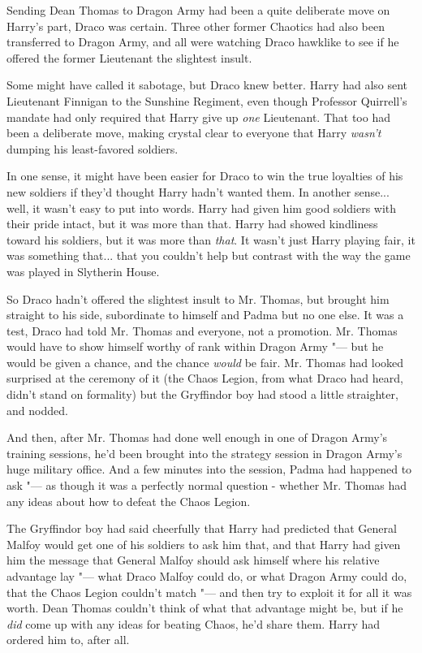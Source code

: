 Sending Dean Thomas to Dragon Army had been a quite deliberate move on
Harry's part, Draco was certain. Three other former Chaotics had also
been transferred to Dragon Army, and all were watching Draco hawklike to
see if he offered the former Lieutenant the slightest insult.

Some might have called it sabotage, but Draco knew better. Harry had
also sent Lieutenant Finnigan to the Sunshine Regiment, even though
Professor Quirrell's mandate had only required that Harry give up
\emph{one} Lieutenant. That too had been a deliberate move, making
crystal clear to everyone that Harry \emph{wasn't} dumping his
least-favored soldiers.

In one sense, it might have been easier for Draco to win the true
loyalties of his new soldiers if they'd thought Harry hadn't wanted
them. In another sense... well, it wasn't easy to put into words.
Harry had given him good soldiers with their pride intact, but it was
more than that. Harry had showed kindliness toward his soldiers, but it
was more than \emph{that}. It wasn't just Harry playing fair, it was
something that... that you couldn't help but contrast with the way
the game was played in Slytherin House.

So Draco hadn't offered the slightest insult to Mr. Thomas, but brought
him straight to his side, subordinate to himself and Padma but no one
else. It was a test, Draco had told Mr. Thomas and everyone, not a
promotion. Mr. Thomas would have to show himself worthy of rank within
Dragon Army "--- but he would be given a chance, and the chance
\emph{would} be fair. Mr. Thomas had looked surprised at the ceremony of
it (the Chaos Legion, from what Draco had heard, didn't stand on
formality) but the Gryffindor boy had stood a little straighter, and
nodded.

And then, after Mr. Thomas had done well enough in one of Dragon Army's
training sessions, he'd been brought into the strategy session in Dragon
Army's huge military office. And a few minutes into the session, Padma
had happened to ask "--- as though it was a perfectly normal question -
whether Mr. Thomas had any ideas about how to defeat the Chaos Legion.

The Gryffindor boy had said cheerfully that Harry had predicted that
General Malfoy would get one of his soldiers to ask him that, and that
Harry had given him the message that General Malfoy should ask himself
where his relative advantage lay "--- what Draco Malfoy could do, or what
Dragon Army could do, that the Chaos Legion couldn't match "--- and then
try to exploit it for all it was worth. Dean Thomas couldn't think of
what that advantage might be, but if he \emph{did} come up with any
ideas for beating Chaos, he'd share them. Harry had ordered him to,
after all.

